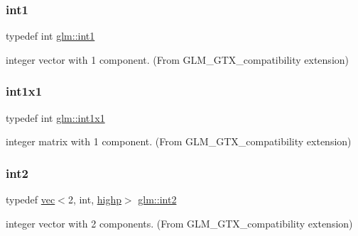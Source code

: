 \subsubsection{\texorpdfstring{int1}{int1}}
{\footnotesize\ttfamily typedef int \mbox{\hyperlink{group__gtx__compatibility_gaba41d7803e4b24c17656d74377b88286}{glm\+::int1}}}



integer vector with 1 component. (From G\+L\+M\+\_\+\+G\+T\+X\+\_\+compatibility extension) 

\mbox{\label{group__gtx__compatibility_ga09016a637a3cd093c22e6188080ac750}} 
\subsubsection{\texorpdfstring{int1x1}{int1x1}}
{\footnotesize\ttfamily typedef int \mbox{\hyperlink{group__gtx__compatibility_ga09016a637a3cd093c22e6188080ac750}{glm\+::int1x1}}}



integer matrix with 1 component. (From G\+L\+M\+\_\+\+G\+T\+X\+\_\+compatibility extension) 

\mbox{\label{group__gtx__compatibility_ga3a3a6007d7619dee4f6c425fe7ac24eb}} 
\subsubsection{\texorpdfstring{int2}{int2}}
{\footnotesize\ttfamily typedef \mbox{\hyperlink{structglm_1_1vec}{vec}}$<$2, int, \mbox{\hyperlink{namespaceglm_a36ed105b07c7746804d7fdc7cc90ff25ac6f7eab42eacbb10d59a58e95e362074}{highp}}$>$ \mbox{\hyperlink{group__gtx__compatibility_ga3a3a6007d7619dee4f6c425fe7ac24eb}{glm\+::int2}}}



integer vector with 2 components. (From G\+L\+M\+\_\+\+G\+T\+X\+\_\+compatibility extension) 

\mbox{\label{group__gtx__compatibility_ga8884c82366cc406dd20e00b78969d001}} 
